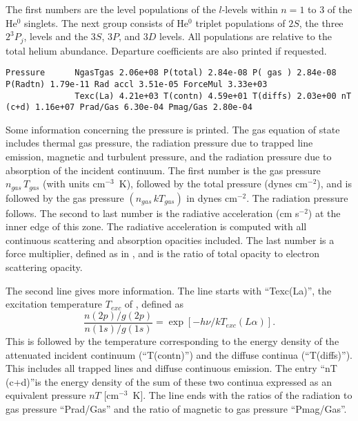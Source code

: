 The first numbers are the level populations of the $l$-levels within
$n=1$ to 3 of the He$^0$ singlets.
The next group consists of He$^0$ triplet populations
of $2S$, the three $2^3P_j$, levels and the $3S$, $3P$, and $3D$ levels.  All populations
are relative to the total helium abundance.
Departure coefficients are
also printed if requested.
{\setverbatimfontsize{\tiny}
\begin{verbatim}
Pressure      NgasTgas 2.06e+08 P(total) 2.84e-08 P( gas ) 2.84e-08 P(Radtn) 1.79e-11 Rad accl 3.51e-05 ForceMul 3.33e+03
              Texc(La) 4.21e+03 T(contn) 4.59e+01 T(diffs) 2.03e+00 nT (c+d) 1.16e+07 Prad/Gas 6.30e-04 Pmag/Gas 2.80e-04
\end{verbatim}
}

Some information concerning the pressure is printed.
The gas equation
of state includes thermal gas pressure, the radiation pressure due to trapped
line emission, magnetic and turbulent pressure, and the radiation pressure
due to absorption of the incident continuum.
The first number is the gas
pressure $n_{gas}\, T_{gas}$ (with units cm$^{-3}$~K), followed by the total pressure
(dynes cm$^{-2}$), and is followed by the gas pressure
$(n_{gas}\, kT_{gas})$ in dynes cm$^{-2}$.
The radiation pressure follows.  The second to last number is the
radiative acceleration (cm s$^{-2}$) at the inner edge of this zone.
The
radiative acceleration is computed with all continuous scattering and
absorption opacities included.  The last number is a force multiplier,
defined as in \citet{Tarter1973}, and is the ratio of total opacity
to electron scattering opacity.

The second line gives more information.
The line starts with
``Texc(La)'', the excitation temperature $T_{exc}$ of \la,
defined as
\begin{equation}
\frac{{n\left( {2p} \right)/g\left( {2p} \right)}}{{n\left( {1s}
\right)/g\left( {1s} \right)}} = \exp \left[ { - h\nu /k{T_{exc}}\left(
{L\alpha } \right)} \right].%
\end{equation}
This is followed by the temperature corresponding to the energy density
of the attenuated incident continuum (``T(contn)'')
and the diffuse continua (``T(diffs)'').
This includes all trapped lines and diffuse continuous
emission.
The entry ``nT (c+d)''is the energy density of the sum of these
two continua expressed as an equivalent pressure $nT$ [cm$^{-3}$~K].
The line
ends with the ratios of the radiation to gas pressure ``Prad/Gas'' and the
ratio of magnetic to gas pressure ``Pmag/Gas''.

